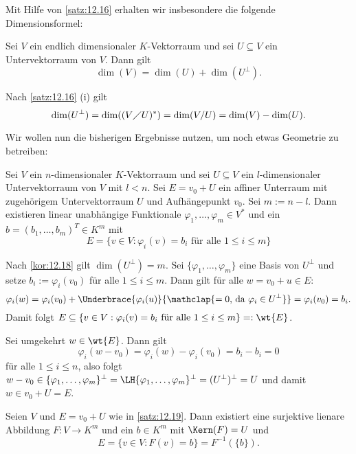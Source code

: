 Mit Hilfe von \autoref{satz:12.16} erhalten wir insbesondere die folgende Dimensionsformel:

\begin{korollar}
	\label{kor:12.18}
	Sei $V$ ein endlich dimensionaler $K$-Vektorraum und sei $U \subseteq V$ ein Untervektorraum von $V$.
	Dann gilt
	\[
		\dim(V) = \dim(U) + \dim(U^\perp).
	\]
\end{korollar}

\begin{beweis}
	Nach \autoref{satz:12.16} (i) gilt
	\[
		\dim(U^\perp) = \dim((V\diagup U)^*) = \dim(V/U) = \dim(V) - \dim(U). 
	\]
\end{beweis}

Wir wollen nun die bisherigen Ergebnisse nutzen, um noch etwas Geometrie zu betreiben:

\begin{satz}
	\label{satz:12.19}
	Sei $V$ ein $n$-dimensionaler $K$-Vektorraum und sei $U \subseteq V$ ein $l$-dimensionaler Untervektorraum von $V$ mit $l < n$.
	Sei $E = v_0 + U$ ein affiner Unterraum mit zugehörigem Untervektorraum $U$ und Aufhängepunkt $v_0$.
	Sei $m := n -l$.
	Dann existieren linear unabhängige Funktionale $\varphi_1, \dots, \varphi_m \in V^*$ und ein $b = (b_1,\dots,b_m)^T \in K^m$ mit
	\[
		E = \{v \in V : \varphi_i(v) = b_i \text{ für alle } 1 \leq i \leq m\}
	\]
\end{satz}
\newpage
\begin{beweis}
	Nach \autoref{kor:12.18} gilt $\dim(U^\perp) = m$.
	Sei $\{\varphi_1,\dots,\varphi_m\}$ eine Basis von $U^\perp$ und setze $b_i := \varphi_i(v_0)$ für alle $1 \leq i \leq m$.
	Dann gilt für alle $w = v_0 + u \in E$:
	\[
		\varphi_i(w) = \varphi_i(v_0) + \Underbrace{\varphi_i(u)}{\mathclap{=0\text{, da } \varphi_i \in U^\perp}} = \varphi_i(v_0) = b_i.
	\]
	Damit folgt $E \subseteq \{v \in V : \varphi_i(v) = b_i \text{ für alle }1 \leq i \leq m\} =: \wt{E}$.
	
	Sei umgekehrt $w \in \wt{E}$.
	Dann gilt
	\[
		\varphi_i(w - v_0) = \varphi_i(w) - \varphi_i(v_0) = b_i - b_i = 0
	\]
	für alle $1 \leq i \leq n$, also folgt $w - v_0 \in \{\varphi_1,\dots,\varphi_m\}^\perp = \LH\{\varphi_1,\dots,\varphi_m\}^\perp = (U^\perp)^\perp = U$ und damit $w \in v_0 + U = E$. 
\end{beweis}

\begin{korollar}
	\label{kor:12.20}
	Seien $V$ und $E = v_0 + U$ wie in \autoref{satz:12.19}.
	Dann existiert eine surjektive lienare Abbildung $F \colon V \rightarrow K^m$ und ein $b \in K^m$ mit $\Kern(F) = U$ und
	\[
		E = \{v \in V : F(v) = b\} = F^{-1}(\{b\}).
	\]
\end{korollar}

